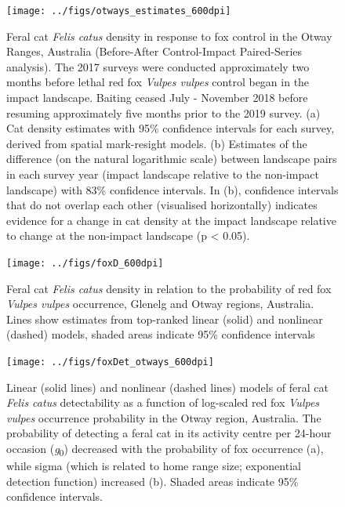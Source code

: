 \documentclass[preprint, 3p, authoryear]{elsarticle} %
\begin{document}
\newpage

\begin{figure}

{\centering \texttt{[image: ../figs/otways\_estimates\_600dpi]} 

}

\caption{Feral cat \textit{Felis catus} density in response to fox control in the Otway Ranges, Australia (Before-After Control-Impact Paired-Series analysis). The 2017 surveys were conducted approximately two months before lethal red fox \textit{Vulpes vulpes} control began in the impact landscape. Baiting ceased July - November 2018 before resuming approximately five months prior to the 2019 survey. (a) Cat density estimates with 95\% confidence intervals for each survey, derived from spatial mark-resight models. (b) Estimates of the difference (on the natural logarithmic scale) between landscape pairs in each survey year (impact landscape relative to the non-impact landscape) with 83\% confidence intervals. In (b), confidence intervals that do not overlap each other (visualised horizontally) indicates evidence for a change in cat density at the impact landscape relative to change at the non-impact landscape (p < 0.05).}\label{fig:diffo}
\end{figure}

\newpage

\begin{figure}

{\centering \texttt{[image: ../figs/foxD\_600dpi]} 

}

\caption{Feral cat \textit{Felis catus} density in relation to the probability of red fox \textit{Vulpes vulpes} occurrence, Glenelg and Otway regions, Australia.  Lines show estimates from top-ranked linear (solid) and nonlinear (dashed) models, shaded areas indicate 95\% confidence intervals}\label{fig:dcor}
\end{figure}

\newpage

\begin{figure}

{\centering \texttt{[image: ../figs/foxDet\_otways\_600dpi]} 

}

\caption{Linear (solid lines) and nonlinear (dashed lines) models of feral cat \textit{Felis catus} detectability as a function of log-scaled red fox \textit{Vulpes vulpes} occurrence probability in the Otway region, Australia. The probability of detecting a feral cat in its activity centre per 24-hour occasion (\textit{g}\textsubscript{0}) decreased with the probability of fox occurrence (a), while sigma (which is related to home range size; exponential detection function) increased (b). Shaded areas indicate 95\% confidence intervals.}\label{fig:detcor}
\end{figure}
\end{document}
